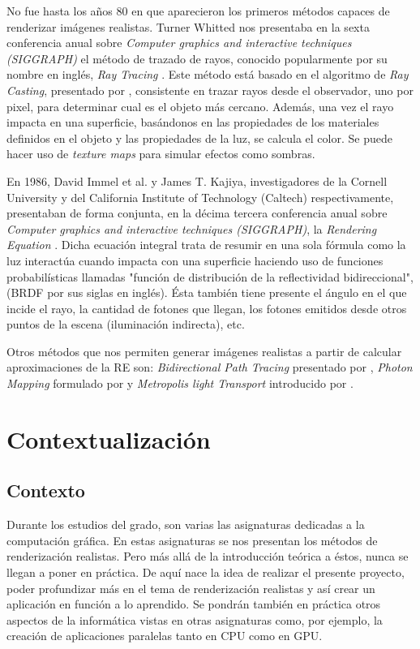 \documentclass[titlepage,12pt]{report}
\begin{document}
No fue hasta los años 80 en que aparecieron los primeros métodos capaces de renderizar imágenes realistas. Turner Whitted nos presentaba en la sexta conferencia anual sobre \textit{Computer graphics and interactive techniques (SIGGRAPH)} el método de trazado de rayos, conocido popularmente por su nombre en inglés, \textit{Ray Tracing} \citep{Whitted1980}. Este método está basado en el algoritmo de \textit{Ray Casting}, presentado por \citep{Appel1968}, consistente en trazar rayos desde el observador, uno por pixel, para determinar cual es el objeto más cercano. Además, una vez el rayo impacta en una superficie, basándonos en las propiedades de los materiales definidos en el objeto y las propiedades de la luz, se calcula el color. Se puede hacer uso de \textit{texture maps} para simular efectos como sombras. 

En 1986, David Immel et al. y James T. Kajiya, investigadores de la Cornell University y del California Institute of Technology (Caltech) respectivamente, presentaban de forma conjunta, en la décima tercera conferencia anual sobre \textit{Computer graphics and interactive techniques (SIGGRAPH)}, la \textit{Rendering Equation} \citep{Kajiya1986, Immel1986}. Dicha ecuación integral trata de resumir en una sola fórmula como la luz interactúa cuando impacta con una superficie haciendo uso de funciones probabilísticas llamadas "función de distribución de la reflectividad bidireccional", (BRDF por sus siglas en inglés). Ésta también tiene presente el ángulo en el que incide el rayo, la cantidad de fotones que llegan, los fotones emitidos desde otros puntos de la escena (iluminación indirecta), etc.

Otros métodos que nos permiten generar imágenes realistas a partir de calcular aproximaciones de la RE son: \textit{Bidirectional Path Tracing} presentado por \citep{Lafortune1993}, \textit{Photon Mapping} formulado por \citep{Jensen1996} y \textit{Metropolis light Transport} introducido por \citep{Veach1997}.

\section{Contextualización}

\subsection{Contexto} \label{ref:contexto}

Durante los estudios del grado, son varias las asignaturas dedicadas a la computación gráfica. En estas asignaturas se nos presentan los métodos de renderización realistas. Pero más allá de la introducción teórica a éstos, nunca se llegan a poner en práctica. De aquí nace la idea de realizar el presente proyecto, poder profundizar más en el tema de renderización realistas y así crear un aplicación en función a lo aprendido. Se pondrán también en práctica otros aspectos de la informática vistas en otras asignaturas como, por ejemplo, la creación de aplicaciones paralelas tanto en CPU como en GPU.
\end{document}
